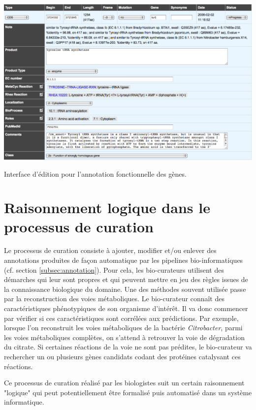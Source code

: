 \begin{refsegment}
    \begin{shadedfigure}[H]
        \centering
        \includegraphics[width=\textwidth]{img/curation_edit.png}
        \caption{Interface d'édition pour l'annotation fonctionnelle des gènes. }
        \label{fig:edit_microscope}
    \end{shadedfigure}
    
    

    \section{Raisonnement logique dans le processus de curation}
    
    Le processus de curation consiste à ajouter, modifier et/ou enlever des annotations produites de façon automatique par les pipelines bio-informatiques (cf. section \cref{subsec:annotation}). Pour cela, les bio-curateurs utilisent des démarches qui leur sont propres et qui peuvent mettre en jeu des règles issues de la connaissance biologique du domaine. Une des méthodes souvent utilisée passe par la reconstruction des voies métaboliques. Le bio-curateur connaît des caractéristiques phénotypiques de son organisme d’intérêt. Il va donc commencer par vérifier si ces caractéristiques sont corrélées aux prédictions. Par exemple, lorsque l’on reconstruit les voies métaboliques de la bactérie \textit{Citrobacter}, parmi les voies métaboliques complètes, on s’attend à retrouver la voie de dégradation du citrate. Si certaines réactions de la voie ne sont pas prédites, le bio-curateur va rechercher un ou plusieurs gènes candidats codant des protéines catalysant ces réactions.
    
    Ce processus de curation réalisé par les biologistes suit un certain raisonnement "logique" qui peut potentiellement être formalisé puis automatisé dans un système informatique.
    

\end{refsegment}
